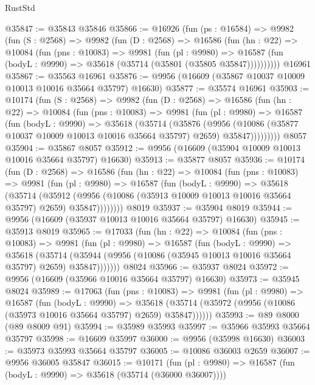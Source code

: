 \begin{lexlean}{RustStd}
\begin{coremodule}
@35847 := @35843 @35846
@35866 := @16926
    (fun (ps : @16584) =>
    @9982
      (fun (S : @2568) =>
      @9982
        (fun (D : @2568) =>
        @16586
          (fun (hn : @22) =>
          @10084
            (fun (pns : @10083) =>
            @9981
              (fun (pl : @9980) =>
              @16587 (fun (bodyL : @9990) => @35618 (@35714 (@35801 (@35805 @35847))))))))))
    @16961
@35867 := @35563 @16961
@35876 := @9956 (@16609 (@35867 @10037 @10009 @10013 @10016 @35664 @35797) @16630)
@35877 := @35574 @16961
@35903 := @10174
    (fun (S : @2568) =>
    @9982
      (fun (D : @2568) =>
      @16586
        (fun (hn : @22) =>
        @10084
          (fun (pns : @10083) =>
          @9981
            (fun (pl : @9980) =>
            @16587
              (fun (bodyL : @9990) =>
              @35618
                (@35714
                  (@35876
                    (@9956
                      (@10086 (@35877 @10037 @10009 @10013 @10016 @35664 @35797) @2659)
                      @35847)))))))))
    @8057
@35904 := @35867 @8057
@35912 := @9956 (@16609 (@35904 @10009 @10013 @10016 @35664 @35797) @16630)
@35913 := @35877 @8057
@35936 := @10174
    (fun (D : @2568) =>
    @16586
      (fun (hn : @22) =>
      @10084
        (fun (pns : @10083) =>
        @9981
          (fun (pl : @9980) =>
          @16587
            (fun (bodyL : @9990) =>
            @35618
              (@35714
                (@35912
                  (@9956 (@10086 (@35913 @10009 @10013 @10016 @35664 @35797) @2659) @35847))))))))
    @8019
@35937 := @35904 @8019
@35944 := @9956 (@16609 (@35937 @10013 @10016 @35664 @35797) @16630)
@35945 := @35913 @8019
@35965 := @17033
    (fun (hn : @22) =>
    @10084
      (fun (pns : @10083) =>
      @9981
        (fun (pl : @9980) =>
        @16587
          (fun (bodyL : @9990) =>
          @35618
            (@35714 (@35944 (@9956 (@10086 (@35945 @10013 @10016 @35664 @35797) @2659) @35847)))))))
    @8024
@35966 := @35937 @8024
@35972 := @9956 (@16609 (@35966 @10016 @35664 @35797) @16630)
@35973 := @35945 @8024
@35989 := @17063
    (fun (pns : @10083) =>
    @9981
      (fun (pl : @9980) =>
      @16587
        (fun (bodyL : @9990) =>
        @35618 (@35714 (@35972 (@9956 (@10086 (@35973 @10016 @35664 @35797) @2659) @35847))))))
@35993 := @89 @8000 (@89 @8009 @91)
@35994 := @35989 @35993
@35997 := @35966 @35993 @35664 @35797
@35998 := @16609 @35997
@36000 := @9956 (@35998 @16630)
@36003 := @35973 @35993 @35664 @35797
@36005 := @10086 @36003 @2659
@36007 := @9956 @36005 @35847
@36015 := @10171
    (fun (pl : @9980) => @16587 (fun (bodyL : @9990) => @35618 (@35714 (@36000 @36007))))

\end{coremodule}
\end{lexlean}
